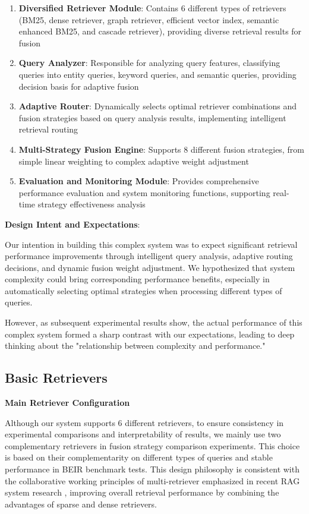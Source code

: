 \documentclass[letterpaper]{article} %
\begin{document}
\begin{enumerate}
\item \textbf{Diversified Retriever Module}: Contains 6 different types of retrievers (BM25, dense retriever, graph retriever, efficient vector index, semantic enhanced BM25, and cascade retriever), providing diverse retrieval results for fusion

\item \textbf{Query Analyzer}: Responsible for analyzing query features, classifying queries into entity queries, keyword queries, and semantic queries, providing decision basis for adaptive fusion

\item \textbf{Adaptive Router}: Dynamically selects optimal retriever combinations and fusion strategies based on query analysis results, implementing intelligent retrieval routing

\item \textbf{Multi-Strategy Fusion Engine}: Supports 8 different fusion strategies, from simple linear weighting to complex adaptive weight adjustment

\item \textbf{Evaluation and Monitoring Module}: Provides comprehensive performance evaluation and system monitoring functions, supporting real-time strategy effectiveness analysis
\end{enumerate}

\textbf{Design Intent and Expectations}:

Our intention in building this complex system was to expect significant retrieval performance improvements through intelligent query analysis, adaptive routing decisions, and dynamic fusion weight adjustment. We hypothesized that system complexity could bring corresponding performance benefits, especially in automatically selecting optimal strategies when processing different types of queries.

However, as subsequent experimental results show, the actual performance of this complex system formed a sharp contrast with our expectations, leading to deep thinking about the "relationship between complexity and performance."

\subsection{Basic Retrievers}

\textbf{Main Retriever Configuration}

Although our system supports 6 different retrievers, to ensure consistency in experimental comparisons and interpretability of results, we mainly use two complementary retrievers in fusion strategy comparison experiments. This choice is based on their complementarity on different types of queries and stable performance in BEIR benchmark tests. This design philosophy is consistent with the collaborative working principles of multi-retriever emphasized in recent RAG system research \cite{gao2024retrieval}, improving overall retrieval performance by combining the advantages of sparse and dense retrievers.
\end{document}
